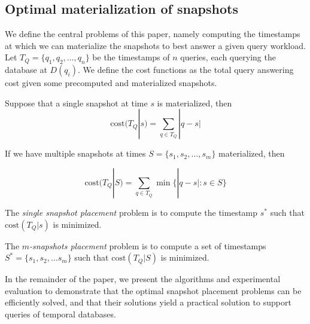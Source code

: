 \subsection{Optimal materialization of snapshots}

We define the central problems of this paper, namely computing the timestamps at
which we can materialize the snapshots to best answer a given query workload.
Let $T_Q = \{q_1, q_2, \dots, q_n\}$ be the timestamps of $n$ queries, each 
querying the database at $D(q_i)$.  We define the cost functions as the total
query answering cost given some precomputed and materialized snapshots.

\begin{definition}
    Suppose that a single snapshot at time $s$ is materialized, then
    $$\mathrm{cost}(T_Q | s) = \sum_{q\in T_Q} |q - s|$$

    If we have multiple snapshots at times $S=\{s_1, s_2, \dots, s_m\}$
    materialized, then

    $$\mathrm{cost}(T_Q|S) = \sum_{q\in T_Q} \min\{|q-s| : s\in S\}$$
\end{definition}

\begin{definition}
    The {\em single snapshot placement} problem is
    to compute the timestamp $s^*$ such that $\mathrm{cost}(T_Q | s)$ is
    minimized.

    The {\em $m$-snapshots placement} problem is
    to compute a set of timestamps $S^* = \{s_1, s_2, \dots s_m\}$
    such that $\mathrm{cost}(T_Q | S)$ is minimized.
\end{definition}

In the remainder of the paper, we present the algorithms and experimental
evaluation to demonstrate that the optimal snapshot placement problems can be
efficiently solved, and that their solutions yield a practical solution to
support queries of temporal databases.
